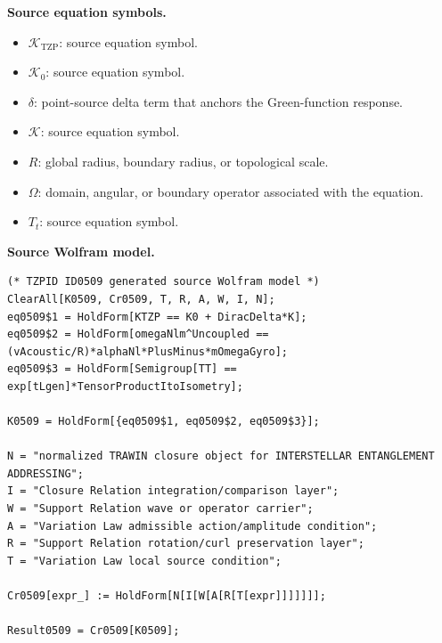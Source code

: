 \begin{minipage}[t]{0.49\linewidth}
\begingroup
\small
\raggedright
\textbf{Source equation symbols.}\par
\begin{itemize}[leftmargin=1.35em,itemsep=1pt,topsep=1pt,parsep=0pt]
    \item $\mathcal{K}_{\mathrm{TZP}}$: source equation symbol.
    \item $\mathcal{K}_0$: source equation symbol.
    \item $\delta$: point-source delta term that anchors the Green-function response.
    \item $\mathcal{K}$: source equation symbol.
    \item $R$: global radius, boundary radius, or topological scale.
    \item $\Omega$: domain, angular, or boundary operator associated with the equation.
    \item $T_t$: source equation symbol.
\end{itemize}
\endgroup
\end{minipage}\hfill
\begin{minipage}[t]{0.47\linewidth}
\begingroup
\scriptsize
\raggedright
\textbf{Source Wolfram model.}\par
\begin{Verbatim}[fontsize=\tiny,breaklines=true,breakanywhere=true]
(* TZPID ID0509 generated source Wolfram model *)
ClearAll[K0509, Cr0509, T, R, A, W, I, N];
eq0509$1 = HoldForm[KTZP == K0 + DiracDelta*K];
eq0509$2 = HoldForm[omegaNlm^Uncoupled == (vAcoustic/R)*alphaNl*PlusMinus*mOmegaGyro];
eq0509$3 = HoldForm[Semigroup[TT] == exp[tLgen]*TensorProductItoIsometry];

K0509 = HoldForm[{eq0509$1, eq0509$2, eq0509$3}];

N = "normalized TRAWIN closure object for INTERSTELLAR ENTANGLEMENT ADDRESSING";
I = "Closure Relation integration/comparison layer";
W = "Support Relation wave or operator carrier";
A = "Variation Law admissible action/amplitude condition";
R = "Support Relation rotation/curl preservation layer";
T = "Variation Law local source condition";

Cr0509[expr_] := HoldForm[N[I[W[A[R[T[expr]]]]]]];

Result0509 = Cr0509[K0509];
\end{Verbatim}
\endgroup
\end{minipage}

